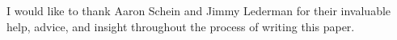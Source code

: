 I would like to thank Aaron Schein and Jimmy Lederman for their invaluable help, advice,
and insight throughout the process of writing this paper.